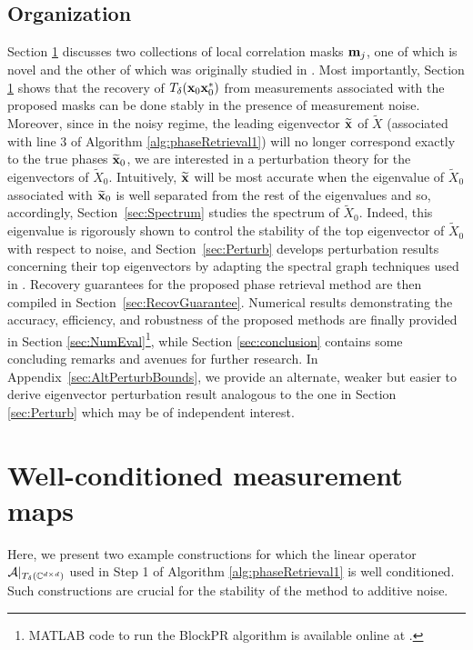 \subsection{Organization}
Section \ref{sec:MeasMatrix} discusses two collections of local correlation masks $\mathbf m_j$, one of which is novel and the other of which was originally studied in \cite{IVW2015_FastPhase}.  Most importantly, Section \ref{sec:MeasMatrix} shows that the recovery of $T_\delta(\mathbf x_0\mathbf x_0^*)$ from measurements associated with the proposed masks can be done stably in the presence of measurement noise.  Moreover, since in the noisy regime, the leading eigenvector $\widetilde{\mathbf x}$ of $\widetilde{X}$ (associated with line 3 of Algorithm \ref{alg:phaseRetrieval1}) will no longer correspond exactly to the true phases $\widetilde{\mathbf x}_0$, we are interested in a perturbation theory for the eigenvectors of $\widetilde{X}_0$.  Intuitively, $\widetilde{\mathbf x}$ will be most accurate when the eigenvalue of $\widetilde X_0$ associated with $\widetilde{\mathbf x}_0$ is well separated from the rest of the eigenvalues and so, accordingly, Section~\ref{sec:Spectrum} studies the spectrum of $\widetilde X_0$.  Indeed, this eigenvalue is rigorously shown to control the stability of the top eigenvector of $\widetilde{X}_0$ with respect to noise, and Section~\ref{sec:Perturb} develops perturbation results concerning their top eigenvectors by adapting the spectral graph techniques used in \cite{alexeev2014phase}.  Recovery guarantees for the proposed phase retrieval method are then compiled in Section~\ref{sec:RecovGuarantee}.  Numerical results demonstrating the accuracy, efficiency, and robustness of the proposed methods are finally provided in Section \ref{sec:NumEval}\footnote{MATLAB code to run the BlockPR algorithm is available online at \cite{bitbucket_BlockPR}.}, while Section \ref{sec:conclusion} contains some concluding remarks and avenues for further research.  In Appendix~\ref{sec:AltPerturbBounds}, we provide an alternate, weaker but easier to derive eigenvector perturbation result analogous to the one in Section \ref{sec:Perturb} which may be of independent interest.


\section{Well-conditioned measurement maps}
\label{sec:MeasMatrix}
Here, we present two example constructions for which the linear operator $\mathcal{A}|_{T_\delta(\mathbb{C}^{d\times d})}$ used in Step 1 of Algorithm \ref{alg:phaseRetrieval1} is well conditioned. Such constructions are crucial for the stability of the method to additive noise. 

